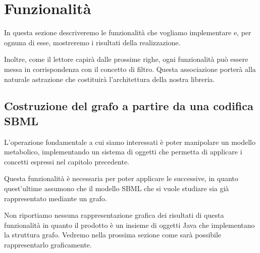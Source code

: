 \section{Funzionalit\`a}
\label{section:use-cases}

In questa sezione descriveremo le funzionalit\`a che vogliamo
implementare e, per ognuna di esse, mostreremo i risultati della
realizzazione.

Inoltre, come il lettore capir\`a dalle prossime righe, ogni
funzionalit\`a pu\`o essere messa in corrispondenza con il concetto di
filtro. Questa associazione porter\`a alla naturale astrazione che
costituir\`a l'architettura della nostra libreria.

\subsection{Costruzione del grafo a partire da una codifica SBML}
L'operazione fondamentale a cui siamo interessati \`e poter manipolare
un modello metabolico, implementando un sistema di oggetti che
permetta di applicare i concetti espressi nel capitolo precedente.

Questa funzionalit\`a \`e necessaria per poter applicare le
successive, in quanto quest'ultime assumono che il modello SBML che si
vuole studiare sia gi\`a rappresentato mediante un grafo.

Non riportiamo nessuna rappresentazione grafica dei risultati di
questa funzionalit\`a in quanto il prodotto \`e un insieme di oggetti
Java che implementano la struttura grafo. Vedremo nella prossima
sezione come sar\`a possibile rappresentarlo graficamente.

